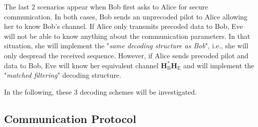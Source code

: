 \documentclass[journal,comsoc]{IEEEtran}
\let\MYoriglatexcaption\caption
\renewcommand{\caption}[2][\relax]{\MYoriglatexcaption[#2]{#2}}
\newcommand{\HE}{\textbf{H}_{\text{E}}}
\newcommand{\HB}{\textbf{H}_{\text{B}}}
\begin{document}
The last 2 scenarios appear when Bob first asks to Alice for secure communication. In both cases, Bob sends an unprecoded pilot to Alice allowing her to know Bob's channel. If Alice only transmits precoded data to Bob, Eve will not be able to know anything about the communication parameters. In that situation, she will implement the "\textit{same decoding structure as Bob}", i.e., she will only despread the received sequence. However, if Alice sends precoded pilot and data to Bob, Eve will know her equivalent channel $\HB^*\HE$ and will implement the "\textit{matched filtering}" decoding structure. 

In the following, these 3 decoding schemes will be investigated.




%
%
%




\subsection{Communication Protocol}
\end{document}
